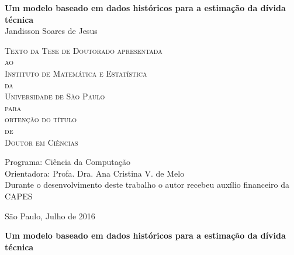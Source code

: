 \documentclass[11pt,twoside,a4paper]{book}
\begin{document}
\frontmatter 
\fancyhead[RO]{{\footnotesize\rightmark}\hspace{2em}\thepage}
\setcounter{tocdepth}{2}
\fancyhead[LE]{\thepage\hspace{2em}\footnotesize{\leftmark}}
\fancyhead[RE,LO]{}
\fancyhead[RO]{{\footnotesize\rightmark}\hspace{2em}\thepage}

\onehalfspacing  %

\thispagestyle{empty}
\begin{center}
    \vspace*{2.3cm}
    \textbf{\Large{Um modelo baseado em dados históricos para a estimação da dívida técnica}}\\
    
    \vspace*{1.2cm}
    \Large{Jandisson Soares de Jesus}
    
    \vskip 2cm
    \textsc{
    Texto da Tese de Doutorado apresentada\\[-0.25cm] 
    ao\\[-0.25cm]
    Instituto de Matemática e Estatística\\[-0.25cm]
    da\\[-0.25cm]
    Universidade de São Paulo\\[-0.25cm]
    para\\[-0.25cm]
    obtenção do título\\[-0.25cm]
    de\\[-0.25cm]
    Doutor em Ciências}
    
    \vskip 1.5cm
    Programa: Ciência da Computação\\
    Orientadora: Profa. Dra. Ana Cristina V. de Melo\\


   	\vskip 1cm
    \normalsize{Durante o desenvolvimento deste trabalho o autor recebeu auxílio
    financeiro da CAPES}
    
    \vskip 0.5cm
    \normalsize{São Paulo, Julho de 2016}
\end{center}

%
%
%
\newpage
\thispagestyle{empty}
    \begin{center}
        \vspace*{2.3 cm}
        \textbf{\Large{Um modelo baseado em dados históricos para a estimação da dívida técnica}}\\
        \vspace*{2 cm}
    \end{center}
\end{document}
